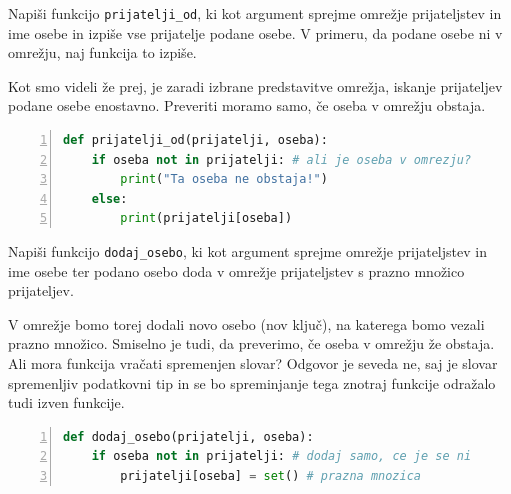 \begin{zgled}
Napiši funkcijo \texttt{prijatelji\_od}, ki kot argument sprejme omrežje prijateljstev in ime osebe in izpiše vse prijatelje podane osebe. V primeru, da podane osebe ni v omrežju, naj funkcija to izpiše.
\end{zgled}
\begin{resitev}
Kot smo videli že prej, je zaradi izbrane predstavitve omrežja, iskanje prijateljev podane osebe enostavno. Preveriti moramo samo, če oseba v omrežju obstaja.
\begin{lstlisting}[language=Python,numbers=left]
def prijatelji_od(prijatelji, oseba):
    if oseba not in prijatelji: # ali je oseba v omrezju?
        print("Ta oseba ne obstaja!")
    else:
        print(prijatelji[oseba])
\end{lstlisting}
\end{resitev}

\begin{zgled}
Napiši funkcijo \texttt{dodaj\_osebo}, ki kot argument sprejme omrežje prijateljstev in ime osebe ter podano osebo doda v omrežje prijateljstev s prazno množico prijateljev.
\end{zgled}
\begin{resitev}
V omrežje bomo torej dodali novo osebo (nov ključ), na katerega bomo vezali prazno množico. Smiselno je tudi, da preverimo, če oseba v omrežju že obstaja. Ali mora funkcija vračati spremenjen slovar? Odgovor je seveda ne, saj je slovar spremenljiv podatkovni tip in se bo spreminjanje tega znotraj funkcije odražalo tudi izven funkcije.
\begin{lstlisting}[language=Python,numbers=left]
def dodaj_osebo(prijatelji, oseba):
    if oseba not in prijatelji: # dodaj samo, ce je se ni
        prijatelji[oseba] = set() # prazna mnozica
\end{lstlisting}
\end{resitev}

